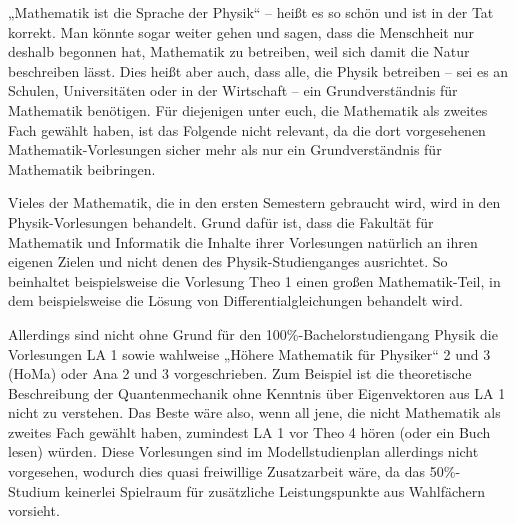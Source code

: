 „Mathematik ist die Sprache der Physik“ -- heißt es so schön und ist in der Tat korrekt. Man könnte sogar weiter gehen und sagen, dass die Menschheit nur deshalb begonnen hat, Mathematik zu betreiben, weil sich damit die Natur beschreiben lässt. Dies heißt aber auch, dass alle, die Physik betreiben -- sei es an Schulen, Universitäten oder in der Wirtschaft -- ein Grundverständnis für Mathematik benötigen. Für diejenigen unter euch, die Mathematik als zweites Fach gewählt haben, ist das Folgende nicht relevant, da die dort vorgesehenen Mathematik-Vorlesungen sicher mehr als nur ein Grundverständnis für Mathematik beibringen. 

Vieles der Mathematik, die in den ersten Semestern gebraucht wird, wird in den Physik-Vorlesungen behandelt. Grund dafür ist, dass die Fakultät für Mathematik und Informatik die Inhalte ihrer Vorlesungen natürlich an ihren eigenen Zielen und nicht denen des Physik-Studienganges ausrichtet. So beinhaltet beispielsweise die Vorlesung Theo 1 einen großen Mathematik-Teil, in dem beispielsweise die Lösung von Differentialgleichungen behandelt wird.

Allerdings sind nicht ohne Grund für den 100\%-Bachelorstudiengang Physik die Vorlesungen LA 1 sowie wahlweise „Höhere Mathematik für Physiker“ 2 und 3 (\gls{HoMa}) oder Ana 2 und 3 vorgeschrieben. Zum Beispiel ist die theoretische Beschreibung der Quantenmechanik ohne Kenntnis über Eigenvektoren aus LA 1 nicht zu verstehen. Das Beste wäre also, wenn all jene, die nicht Mathematik als zweites Fach gewählt haben, zumindest LA 1 vor Theo 4 hören (oder ein Buch lesen) würden. Diese Vorlesungen sind im Modellstudienplan allerdings nicht vorgesehen, wodurch dies quasi freiwillige Zusatzarbeit wäre, da das 50\%-Studium keinerlei Spielraum für zusätzliche Leistungspunkte aus Wahlfächern vorsieht.


